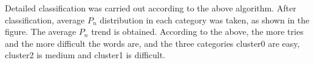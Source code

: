 \documentclass[
  journal=medium,
  manuscript=Report,
  year=2023,
  volume=37,
]{cup-journal}
\begin{document}
\begin{figure}[!htbp]
    \centering
    \hfill
    \label{combine4}
\end{figure}

Detailed classification was carried out according to the above algorithm. After classification, average $P_n$ distribution in each category was taken, as shown in the figure. The average $P_n$ trend is obtained. According to the above, the more tries and the more difficult the words are, and the three categories cluster0 are easy, cluster2 is medium and cluster1 is difficult.

\begin{figure}[!htbp]
    \centering
    \hfill
    \label{combine5}
\end{figure}
\end{document}
